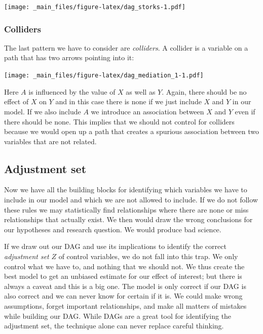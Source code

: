 \documentclass[
]{book}
\begin{document}
\texttt{[image: \_main\_files/figure-latex/dag\_storks-1.pdf]}

\hypertarget{colliders}{%
\subsubsection{Colliders}\label{colliders}}

The last pattern we have to consider are \emph{colliders}. A collider is a
variable on a path that has two arrows pointing into it:

\texttt{[image: \_main\_files/figure-latex/dag\_mediation\_1-1.pdf]}

Here \(A\) is influenced by the value of \(X\) as well as \(Y\). Again, there
should be no effect of \(X\) on \(Y\) and in this case there is none if we
just include \(X\) and \(Y\) in our model. If we also include \(A\) we
introduce an association between \(X\) and \(Y\) even if there should be
none. This implies that we should not control for colliders because we
would open up a path that creates a spurious association between two
variables that are not related.

\hypertarget{adjustment-set}{%
\subsection{Adjustment set}\label{adjustment-set}}

Now we have all the building blocks for identifying which variables we
have to include in our model and which we are not allowed to include. If
we do not follow these rules we may statistically find relationships
where there are none or miss relationships that actually exist. We then
would draw the wrong conclusions for our hypotheses and research
question. We would produce bad science.

If we draw out our DAG and use its implications to identify the correct
\emph{adjustment set} \(Z\) of control variables, we do not fall into this
trap. We only control what we have to, and nothing that we should not.
We thus create the best model to get an unbiased estimate for our effect
of interest; but there is always a caveat and this is a big one. The
model is only correct if our DAG is also correct and we can never know
for certain if it is. We could make wrong assumptions, forget important
relationships, and make all matters of mistakes while building our DAG.
While DAGs are a great tool for identifying the adjustment set, the
technique alone can never replace careful thinking.
\end{document}
